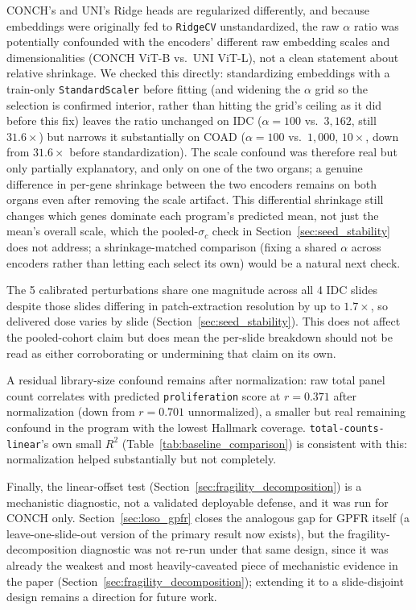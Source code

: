 \documentclass[11pt]{article}
\begin{document}
CONCH's and UNI's Ridge heads are regularized differently, and because embeddings were originally fed to \texttt{RidgeCV} unstandardized, the raw $\alpha$ ratio was potentially confounded with the encoders' different raw embedding scales and dimensionalities (CONCH ViT-B vs.\ UNI ViT-L), not a clean statement about relative shrinkage. We checked this directly: standardizing embeddings with a train-only \texttt{StandardScaler} before fitting (and widening the $\alpha$ grid so the selection is confirmed interior, rather than hitting the grid's ceiling as it did before this fix) leaves the ratio unchanged on IDC ($\alpha=100$ vs.\ $3{,}162$, still $31.6\times$) but narrows it substantially on COAD ($\alpha=100$ vs.\ $1{,}000$, $10\times$, down from $31.6\times$ before standardization). The scale confound was therefore real but only partially explanatory, and only on one of the two organs; a genuine difference in per-gene shrinkage between the two encoders remains on both organs even after removing the scale artifact. This differential shrinkage still changes which genes dominate each program's predicted mean, not just the mean's overall scale, which the pooled-$\sigma_c$ check in Section~\ref{sec:seed_stability} does not address; a shrinkage-matched comparison (fixing a shared $\alpha$ across encoders rather than letting each select its own) would be a natural next check.

The 5 calibrated perturbations share one magnitude across all 4 IDC slides despite those slides differing in patch-extraction resolution by up to $1.7\times$, so delivered dose varies by slide (Section~\ref{sec:seed_stability}). This does not affect the pooled-cohort claim but does mean the per-slide breakdown should not be read as either corroborating or undermining that claim on its own.

A residual library-size confound remains after normalization: raw total panel count correlates with predicted \texttt{proliferation} score at $r=0.371$ after normalization (down from $r=0.701$ unnormalized), a smaller but real remaining confound in the program with the lowest Hallmark coverage. \texttt{total-counts-linear}'s own small $R^2$ (Table~\ref{tab:baseline_comparison}) is consistent with this: normalization helped substantially but not completely.

Finally, the linear-offset test (Section~\ref{sec:fragility_decomposition}) is a mechanistic diagnostic, not a validated deployable defense, and it was run for CONCH only. Section~\ref{sec:loso_gpfr} closes the analogous gap for GPFR itself (a leave-one-slide-out version of the primary result now exists), but the fragility-decomposition diagnostic was not re-run under that same design, since it was already the weakest and most heavily-caveated piece of mechanistic evidence in the paper (Section~\ref{sec:fragility_decomposition}); extending it to a slide-disjoint design remains a direction for future work.
\end{document}
